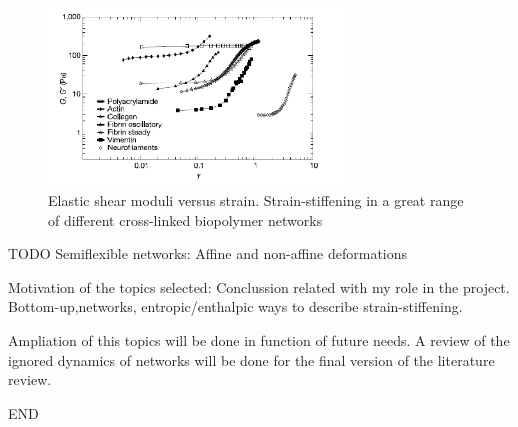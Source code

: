 \begin{figure}[h]
\begin{center}
\includegraphics[width=0.7\textwidth,height=0.5\textwidth]{Figures/strainstiffening_storm.png}%

\caption[Strain-stiffening in semiflexible
polymers]{ Elastic shear moduli versus
strain. Strain-stiffening in a great range of different cross-linked biopolymer
networks\citep{storm_nonlinear_2005,carrillo_nonlinear_2013}}
\label{fig:strainstiffening-storm}
\end{center}
\end{figure}
 TODO
 Semiflexible networks:
Affine and non-affine deformations

Motivation of the topics selected:
Conclussion related with my role in the project. Bottom-up,networks,
entropic/enthalpic ways to describe strain-stiffening.

Ampliation of this topics will be done in function of future needs. A review of
the ignored dynamics of networks will be done for the final version of the
literature review.

END






